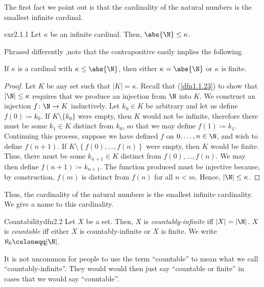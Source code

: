 The first fact we point out is that the cardinality of the natural numbers is the smallest infinite cardinal.
\begin{prp}{}{exr2.1.1}
Let $\kappa$ be an infinite cardinal.  Then, $\abs{\N}\leq \kappa$.
\begin{rmk}
Phrased differently ,note that the contrapositive easily implies the following.
\begin{displayquote}
If $\kappa$ is a cardinal with $\kappa \leq \abs{\N}$, then either $\kappa =\abs{\N}$ or $\kappa$ is finite.
\end{displayquote}
\end{rmk}
\begin{proof}
Let $K$ be any set such that $|K|=\kappa$.  Recall that (\cref{dfn1.1.23}) to show that $|\N |\leq \kappa$ requires that we produce an injection from $\N$ into $K$.  We construct an injection $f\colon \N \rightarrow K$ inductively.  Let $k_0\in K$ be arbitrary and let us define $f(0)\coloneqq k_0$.  If $K\setminus \{ k_0\}$ were empty, then $K$ would not be infinite, therefore there must be some $k_1\in K$ distinct from $k_0$, so that we may define $f(1)\coloneqq k_1$.  Continuing this process, suppose we have defined $f$ on $0,\ldots ,n\in \N$, and wish to define $f(n+1)$.  If $K\setminus \left\{ f(0),\ldots ,f(n)\right\}$ were empty, then $K$ would be finite.  Thus, there must be some $k_{n+1}\in K$ distinct from $f(0),\ldots ,f(n)$.  We may then define $f(n+1)\coloneqq k_{n+1}$.  The function produced must be injective because, by construction, $f(m)$ is distinct from $f(n)$ for all $n<m$.  Hence, $|\N |\leq \kappa$.
\end{proof}
\end{prp}
Thus, the cardinality of the natural numbers is the smallest infinite cardinality.  We give a name to this cardinality.
\begin{dfn}{Countability}{dfn2.2}
Let $X$ be a set.  Then, $X$ is \emph{countably-infinite} iff $|X|=|\N |$.  $X$ is \emph{countable} iff either $X$ is countably-infinite or $X$ is finite.  We write $\aleph _0\coloneqq |\N |$.
\begin{rmk}
It is not uncommon for people to use the term ``countable'' to mean what we call ``countably-infinite''.  They would would then just say ``countable or finite'' in cases that we would say ``countable''.
\end{rmk}
\end{dfn}

